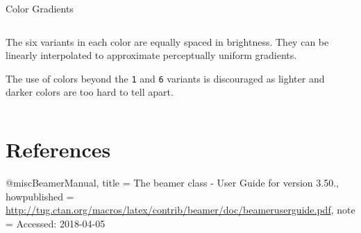 \documentclass[aspectratio=169]{beamer}
\begin{document}
\begin{frame}{Color Gradients}

\begin{columns}
    \begin{column}{.49\textwidth}
    The six variants in each color are equally spaced in brightness. They can be linearly interpolated to approximate perceptually uniform gradients. 
    \vspace{1em}
    
    The use of colors beyond the \texttt{1} and \texttt{6} variants is discouraged as lighter and darker colors are too hard to tell apart.
    \end{column}

    \begin{column}{.49\textwidth}
        \begin{center}
        \end{center}
    \end{column}
\end{columns}
\end{frame}


\section*{References}
\begin{frame}[allowframebreaks]
  
	\begin{thebibliography}
    @misc{BeamerManual,
      title = {{The beamer class} - User Guide for version 3.50.},
      howpublished = {\url{http://tug.ctan.org/macros/latex/contrib/beamer/doc/beameruserguide.pdf}},
      note = {Accessed: 2018-04-05}
    }
  \end{thebibliography}
\end{frame}
\end{document}
